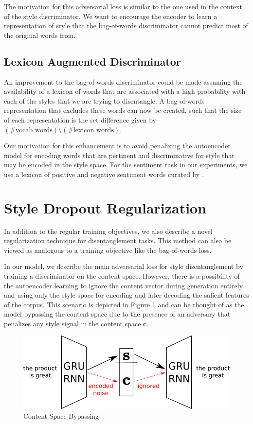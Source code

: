 The motivation for this adversarial loss is similar to the one used in the context of the style discriminator. We want to encourage the encoder to learn a representation of style that the bag-of-words discriminator cannot predict most of the original words from.

\subsection{Lexicon Augmented Discriminator}

An improvement to the bag-of-words discriminator could be made assuming the availability of a lexicon of words that are associated with a high probability with each of the styles that we are trying to disentangle.  A bag-of-words representation that excludes these words can now be created, such that the size of each representation is the set difference given by $(\text{\# vocab words}) \setminus (\text{\# lexicon words})$.

Our motivation for this enhancement is to avoid penalizing the autoencoder model for encoding words that are pertinent and discriminative for style that may be encoded in the style space. For the sentiment task in our experiments, we use a lexicon of positive and negative sentiment words curated by \cite{hu2004mining}.


\section{Style Dropout Regularization} \label{sec:style-dropout}

In addition to the regular training objectives, we also describe a novel regularization technique for disentanglement tasks. This method can also be viewed as analogous to a training objective like the bag-of-words loss.

In our model, we describe the main adversarial loss for style disentanglement by training a discriminator on the content space. However, there is a possibility of the autoencoder learning to ignore the content vector during generation entirely and using only the style space for encoding and later decoding the salient features of the corpus. This scenario is depicted in Figure \ref{fig:model-content-bypass} and can be thought of as the model bypassing the content space due to the presence of an adversary that penalizes any style signal in the content space $\bm c$.

\begin{figure}[ht]
	\centering
	\includegraphics[width=\linewidth]{images/model-content-bypass}
	\caption{Content Space Bypassing}
	\label{fig:model-content-bypass}
\end{figure}

